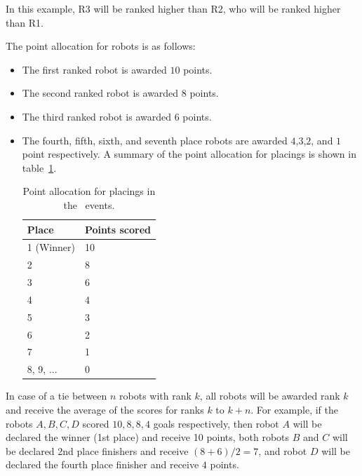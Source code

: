 \documentclass[12pt]{hurocup}
\begin{document}
\begin{lawlist}[OR]
  In this example, R3 will be ranked higher than R2, who will be
  ranked higher than R1.

\item The point allocation for robots is as follows:
  \begin{itemize}
  \item The first ranked robot is awarded $10$ points.
  \item The second ranked robot is awarded $8$ points.
  \item The third ranked robot is awarded $6$ points.
  \item The fourth, fifth, sixth, and seventh place robots are awarded
    $4$,$3$,$2$, and $1$ point respectively.  A summary of the point
    allocation for placings is shown in table~\ref{point-allocation}.

    \begin{table}
      \begin{center}
        \begin{tabular}{l|l}
          \hline
          Place & Points scored \\
          \hline
          1 (Winner) & 10 \\
          2          & 8 \\
          3          & 6 \\
          4          & 4 \\
          5          & 3 \\
          6          & 2 \\
          7          & 1 \\
          8, 9, ...  & 0 \\
          \hline
        \end{tabular}
      \end{center}
      \caption{Point allocation for placings in the \HuroCup\ events.}
      \label{point-allocation}
    \end{table}
  \end{itemize}

\item In case of a tie between $n$ robots with rank $k$, all robots
 will be awarded rank $k$ and receive the average of the scores for
 ranks $k$ to $k+n$.  For example, if the robots $A,B,C,D$ scored $10,
 8, 8, 4$ goals respectively, then robot $A$ will be declared the
 winner (1st place) and receive 10 points, both robots $B$ and $C$
 will be declared 2nd place finishers and receive $(8+6)/2=7$, and
 robot $D$ will be declared the fourth place finisher and receive $4$
 points.

\end{lawlist}
\end{document}
